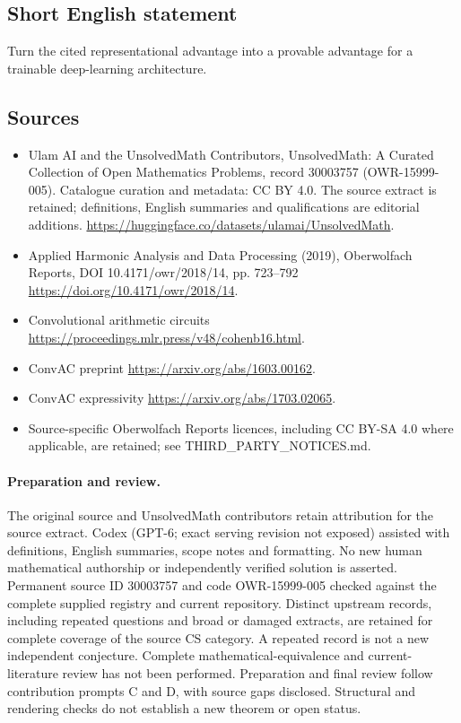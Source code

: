 \documentclass[11pt]{article}
\begin{document}
\subsection{Short English statement}
Turn the cited representational advantage into a provable advantage for a trainable deep-learning architecture.
\subsection{Sources}
\begin{itemize}
\item[\hypertarget{source:30003757:1}{S1}] Ulam AI and the UnsolvedMath Contributors, UnsolvedMath: A Curated Collection of Open Mathematics Problems, record 30003757 (OWR-15999-005). Catalogue curation and metadata: CC BY 4.0. The source extract is retained; definitions, English summaries and qualifications are editorial additions.
\url{https://huggingface.co/datasets/ulamai/UnsolvedMath}.
\item[\hypertarget{source:30003757:2}{S2}] Applied Harmonic Analysis and Data Processing (2019), Oberwolfach Reports, DOI 10.4171/owr/2018/14, pp. 723--792
\url{https://doi.org/10.4171/owr/2018/14}.
\item[\hypertarget{source:30003757:3}{S3}] Convolutional arithmetic circuits
\url{https://proceedings.mlr.press/v48/cohenb16.html}.
\item[\hypertarget{source:30003757:4}{S4}] ConvAC preprint
\url{https://arxiv.org/abs/1603.00162}.
\item[\hypertarget{source:30003757:5}{S5}] ConvAC expressivity
\url{https://arxiv.org/abs/1703.02065}.
\item Source-specific Oberwolfach Reports licences, including CC BY-SA 4.0 where applicable, are retained; see THIRD\_PARTY\_NOTICES.md.
\end{itemize}
\paragraph{Preparation and review.}
The original source and UnsolvedMath contributors retain attribution for the source extract. Codex (GPT-6; exact serving revision not exposed) assisted with definitions, English summaries, scope notes and formatting. No new human mathematical authorship or independently verified solution is asserted. Permanent source ID 30003757 and code OWR-15999-005 checked against the complete supplied registry and current repository. Distinct upstream records, including repeated questions and broad or damaged extracts, are retained for complete coverage of the source CS category. A repeated record is not a new independent conjecture. Complete mathematical-equivalence and current-literature review has not been performed. Preparation and final review follow contribution prompts C and D, with source gaps disclosed. Structural and rendering checks do not establish a new theorem or open status.
\label{end:30003757}
\end{document}
